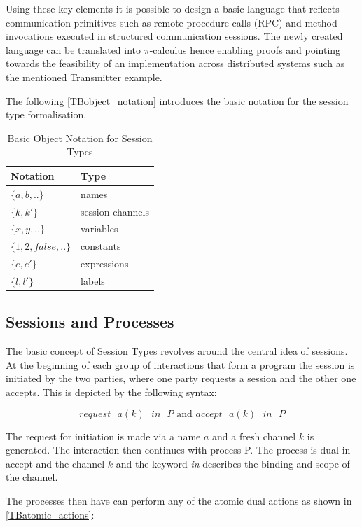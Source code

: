 Using these key elements it is possible to design a basic language that reflects communication primitives such as remote procedure calls (RPC) and method invocations executed in structured communication sessions. The newly created language can be translated into $\pi$-calculus hence enabling proofs and pointing towards the feasibility of an implementation across distributed systems such as the mentioned Transmitter example.

The following \autoref{TBobject_notation} introduces the basic notation for the session type formalisation.

\begin{table}[H]
\center
\caption{Basic Object Notation for Session Types}
\begin{tabular}{|l|l|}
  \hline
  Notation & Type \\
  \hline
  $\{a,b,..\}$ & names \\
  $\{k,k'\}$ & session channels \\
  $\{x,y,..\}$ & variables \\
  $\{1,2,false,..\}$ & constants \\
  $\{e,e'\}$ & expressions \\
  $\{l,l'\}$ & labels \\
  \hline
\end{tabular}
\label{TBobject_notation}
\end{table}

\subsection{Sessions and Processes}
The basic concept of Session Types revolves around the central idea of sessions. At the beginning of each group of interactions that form a program the session is initiated by the two parties, where one party requests a session and the other one accepts. This is depicted by the following syntax:

\[request\mbox{ }a(k)\mbox{ }in\mbox{ }P\mbox{ and }accept\mbox{ }a(k)\mbox{ }in\mbox{ }P\]

The request for initiation is made via a name $a$ and a fresh channel $k$ is generated. The interaction then continues with process P. The process is dual in accept and the channel $k$ and the keyword \textit{in} describes the binding and scope of the channel.

The processes then have can perform any of the atomic dual actions as shown in \autoref{TBatomic_actions}:

